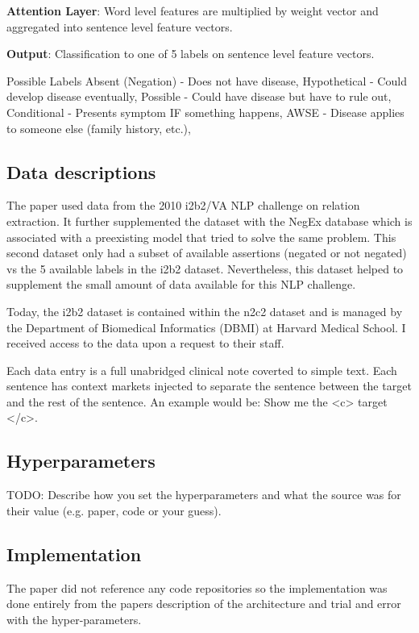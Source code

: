 \documentclass[11pt,a4paper]{article}
\begin{document}
\textbf{Attention Layer}: Word level features are multiplied by weight vector and aggregated into sentence level feature vectors.

\textbf{Output}: Classification to one of 5 labels on sentence level feature vectors.

Possible Labels
Absent (Negation) - Does not have disease,
Hypothetical - Could develop disease eventually,
Possible - Could have disease but have to rule out,
Conditional - Presents symptom IF something happens,
AWSE - Disease applies to someone else (family history, etc.),

\subsection{Data descriptions}
The paper used data from the 2010 i2b2/VA NLP challenge on relation extraction. It further supplemented the dataset with the NegEx database which is associated with a preexisting model that tried to solve the same problem. This second dataset only had a subset of available assertions (negated or not negated) vs the 5 available labels in the i2b2 dataset. Nevertheless, this dataset helped to supplement the small amount of data available for this NLP challenge.

Today, the i2b2 dataset is contained within the n2c2 dataset and is managed by the Department of Biomedical Informatics (DBMI) at Harvard Medical School. I received access to the data upon a request to their staff.

Each data entry is a full unabridged clinical note coverted to simple text. Each sentence has context markets injected to separate the sentence between the target and the rest of the sentence. An example would be: Show me the <c> target </c>. 

\subsection{Hyperparameters}
TODO: 
Describe how you set the hyperparameters and what the source was for their value (e.g. paper, code or your guess). 

\subsection{Implementation}
The paper did not reference any code repositories so the implementation was done entirely from the papers description of the architecture and trial and error with the hyper-parameters. 
\end{document}
